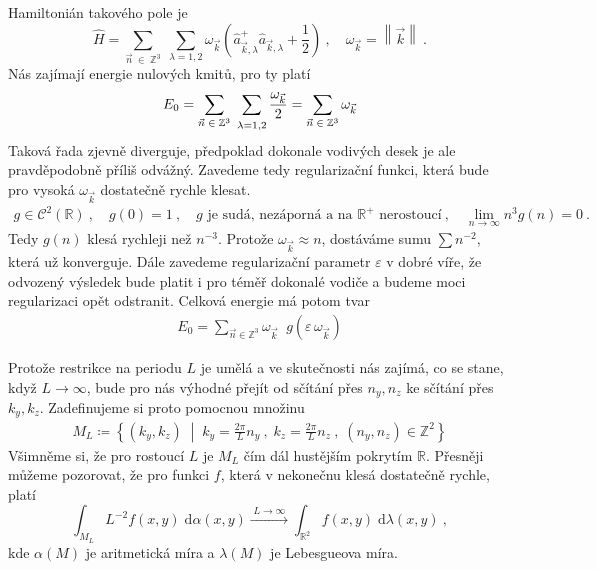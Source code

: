 \documentclass[10pt,a4paper]{article}
\def\vph{\vphantom}
\newcommand{\const}[1]{\text{#1}}
\newcommand{\norm}[1]{\left\lVert#1\right\rVert}
\renewcommand{\d}[1]{\;\const{d}#1}
\def\Z{\mathbb{Z}}
\def\R{\mathbb{R}}
\begin{document}
Hamiltonián takového pole je
\begin{equation*}
    \hat H
    =
    \sum_{\vec n \; \in \; \Z^3} \;
    \sum_{\lambda = 1, 2}
    \omega_{\vec k}
    \left(
        \hat a_{\vec k, \lambda}^+
        \hat a_{\vec k, \lambda}
        + \frac{1}{2}
    \right)
    \: , \quad
    \omega_{\vec k} = \norm{\vec k}
    \: .
\end{equation*}
Nás zajímají energie nulových kmitů, pro ty platí
\begin{equation*}
    E_0 =
    \sum_{\vec n \; \in \; \Z^3} \;
    \sum_{\vph{\vec k} \lambda = 1, 2}
    \frac{\omega_{\vec k}}{2}
    =
    \sum_{\vec n \; \in \; \Z^3} \omega_{\vec k}
\end{equation*}
Taková řada zjevně diverguje, předpoklad dokonale vodivých desek je ale pravděpodobně příliš odvážný. Zavedeme tedy regularizační funkci, která bude pro vysoká $\omega_{\vec k}$ dostatečně rychle klesat.
\begin{gather*}
    g \in \mathcal{C}^2(\R)
    \: , \quad
    g(0) = 1
    \: , \quad
    g \text{ je sudá, nezáporná a na $\R^+$ nerostoucí}
    \: , \quad
    \lim_{n \to \infty} n^3 g(n) = 0
    \: .
\end{gather*}
Tedy $g(n)$ klesá rychleji než $n^{-3}$. Protože $\omega_{\vec k} \approx n$, dostáváme sumu $\sum n^{-2}$, která už konverguje. Dále zavedeme regularizační parametr $\varepsilon$ v dobré víře, že odvozený výsledek bude platit i pro téměř dokonalé vodiče a budeme moci regularizaci opět odstranit. Celková energie má potom tvar
\begin{gather*}
    E_0 =
    \sum_{\vec n \in \Z^3}
    \omega_{\vec k} \;\;
    g(\varepsilon \, \omega_{\vec k})
\end{gather*}

Protože restrikce na periodu $L$ je umělá a ve skutečnosti nás zajímá, co se stane, když $L \to \infty$, bude pro nás výhodné přejít od sčítání přes $n_y, n_z$ ke sčítání přes $k_y, k_z$. Zadefinujeme si proto pomocnou množinu
\begin{gather*}
    M_L \coloneqq \left\{
        (k_y, k_z)
        \; \middle| \;
        k_y = \frac{2\pi}{L} n_y
        \: , \;
        k_z = \frac{2\pi}{L} n_z
        \: , \;
        (n_y, n_z) \in \Z^2
    \right\}
\end{gather*}
Všimněme si, že pro rostoucí $L$ je $M_L$ čím dál hustějším pokrytím $\R$. Přesněji můžeme pozorovat, že pro funkci $f$, která v nekonečnu klesá dostatečně rychle, platí
\begin{equation*}
    \int_{M_L} L^{-2} f(x, y) \d{\alpha}(x, y)
    \xrightarrow{\;L \to \infty\;}
    \int_{\R^2} f(x, y) \d{\lambda}(x, y)
    \: ,
\end{equation*}
kde $\alpha(M)$ je aritmetická míra a $\lambda(M)$ je Lebesgueova míra.
\end{document}
